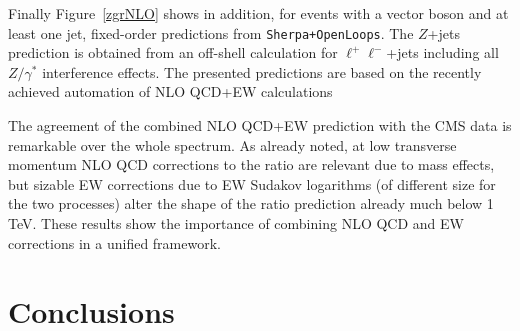 \documentclass{PoS}
\begin{document}
Finally Figure~\ref{zgrNLO} shows in addition, for events with a vector boson and at least one
jet, fixed-order predictions from {\tt Sherpa+OpenLoops}. The $Z$+jets prediction
is obtained from an off-shell calculation for $\ell^+\ell^-$+jets including all $Z/\gamma^*$ interference effects.
The presented predictions are based on the recently achieved automation of NLO QCD+EW 
calculations%

The agreement of the combined NLO QCD+EW prediction with the CMS data is
remarkable over the whole spectrum. As already noted, at low transverse momentum
NLO QCD corrections to the ratio are relevant due to mass effects, but sizable
EW corrections due to EW Sudakov logarithms (of different size for the two
processes) alter the shape of the ratio prediction already much below 1 TeV.
These results show the importance of combining NLO QCD and EW corrections in a
unified framework.

\section{Conclusions}
\end{document}

